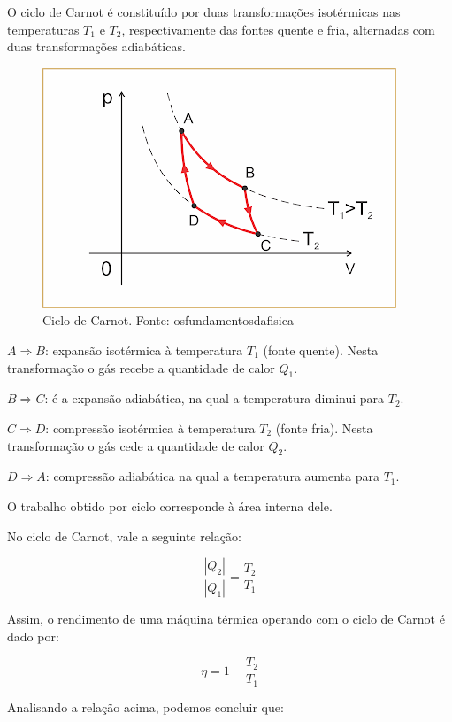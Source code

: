 \documentclass[12pt]{article}
\begin{document}
O ciclo de Carnot é constituído por duas transformações isotérmicas nas temperaturas $T_{1}$ e $T_{2}$, respectivamente das fontes quente e fria, alternadas com duas transformações adiabáticas.


\begin{figure}[h]{}
\centering\includegraphics[width=2.5truein]{img15.png}
\caption{Ciclo de Carnot. Fonte: osfundamentosdafisica}
\centering
\end{figure}

\textbf{$A\Rightarrow B$}: expansão isotérmica à temperatura $T_{1}$ (fonte quente). Nesta transformação o gás recebe a quantidade de calor $Q_{1}$.


\textbf{$B\Rightarrow C$}: é a expansão adiabática, na qual a temperatura diminui para $T_{2}$.


\textbf{$C\Rightarrow D$}: compressão isotérmica à temperatura $T_{2}$ (fonte fria). Nesta transformação o gás cede a quantidade de calor $Q_{2}$.


\textbf{$D\Rightarrow A$}: compressão adiabática na qual a temperatura aumenta para $T_{1}$.


O trabalho obtido por ciclo corresponde à área interna dele.


No ciclo de Carnot, vale a seguinte relação:


\begin{equation}
\dfrac{|Q_{2}|}{|Q_{1}|} = \dfrac{T_{2}}{T_{1}}
\end{equation}


Assim, o rendimento de uma máquina térmica operando com o ciclo de Carnot é dado por:


\begin{equation}
\eta = 1- \dfrac{T_{2}}{T_{1}}
\end{equation}


Analisando a relação acima, podemos concluir que:
\end{document}
